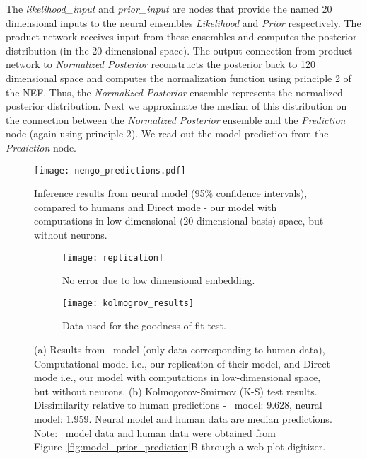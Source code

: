 \documentclass[10pt,letterpaper]{article}
\begin{document}
The \textit{likelihood\_input} and \textit{prior\_input} are nodes that provide the named 20 dimensional inputs to the neural ensembles \textit{Likelihood} and \textit{Prior} respectively. The product network receives input from these ensembles and computes the posterior distribution (in the 20 dimensional space). The output connection from product network to \textit{Normalized Posterior} reconstructs the posterior back to 120 dimensional space and computes the normalization function using principle 2 of the NEF. Thus, the \textit{Normalized Posterior} ensemble represents the normalized posterior distribution. Next we approximate the median of this distribution on the connection between the \textit{Normalized Posterior} ensemble and the \textit{Prediction} node (again using principle 2). We read out the model prediction from the \textit{Prediction} node.

\begin{figure}[t!]
\begin{center}
\texttt{[image: nengo\_predictions.pdf]}
\end{center}
\caption{Inference results from neural model (95\% confidence intervals), compared to humans and Direct mode - our model with computations in low-dimensional (20 dimensional basis) space, but without neurons.}
\label{fig:nengo_predictions}
\end{figure}

\begin{figure*}[h]
    \centering
    \begin{subfigure}{.43\textwidth}
        \texttt{[image: replication]}
        \caption{No error due to low dimensional embedding.} 
        \label{fig:replication}
    \end{subfigure}
    \begin{subfigure}{.43\textwidth}
        \texttt{[image: kolmogrov\_results]}
        \caption{Data used for the goodness of fit test.} 
        \label{fig:kolmogrov_results}
    \end{subfigure}
    \caption{(a) Results from~ model  (only data corresponding to human data), Computational model i.e., our replication of their model, and Direct mode i.e., our model with computations in low-dimensional space, but without neurons. (b) Kolmogorov-Smirnov (K-S) test results. Dissimilarity relative to human predictions -~ model: 9.628, neural model: 1.959. Neural model and human data are median predictions. Note:~ model data and human data were obtained from Figure~\ref{fig:model_prior_prediction}B through a web plot digitizer.
    }\label{fig:model_comparison}
\end{figure*}
\end{document}
